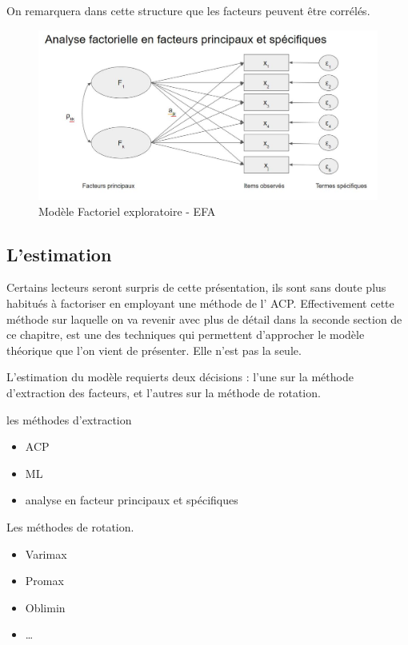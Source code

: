 \documentclass[
]{book}
\providecommand{\tightlist}{%
  \setlength{\itemsep}{0pt}\setlength{\parskip}{0pt}}
\begin{document}
On remarquera dans cette structure que les facteurs peuvent être corrélés.

\begin{figure}
\centering
\includegraphics{./Images/FA01.jpg}
\caption{Modèle Factoriel exploratoire - EFA}
\end{figure}

\hypertarget{lestimation}{%
\subsection{L'estimation}\label{lestimation}}

Certains lecteurs seront surpris de cette présentation, ils sont sans doute plus habitués à factoriser en employant une méthode de l' ACP. Effectivement cette méthode sur laquelle on va revenir avec plus de détail dans la seconde section de ce chapitre, est une des techniques qui permettent d'approcher le modèle théorique que l'on vient de présenter. Elle n'est pas la seule.

L'estimation du modèle requierts deux décisions : l'une sur la méthode d'extraction des facteurs, et l'autres sur la méthode de rotation.

les méthodes d'extraction

\begin{itemize}
\tightlist
\item
  ACP
\item
  ML
\item
  analyse en facteur principaux et spécifiques
\end{itemize}

Les méthodes de rotation.

\begin{itemize}
\tightlist
\item
  Varimax
\item
  Promax
\item
  Oblimin
\item
  \ldots{}
\end{itemize}
\end{document}

